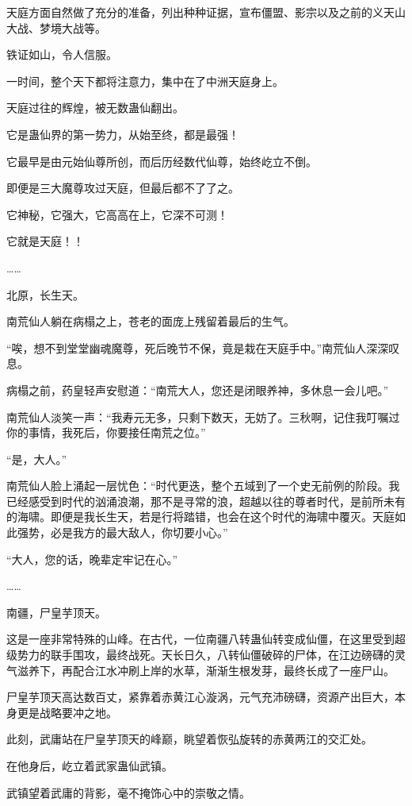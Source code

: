 \begin{this_body}
天庭方面自然做了充分的准备，列出种种证据，宣布僵盟、影宗以及之前的义天山大战、梦境大战等。

铁证如山，令人信服。

一时间，整个天下都将注意力，集中在了中洲天庭身上。

天庭过往的辉煌，被无数蛊仙翻出。

它是蛊仙界的第一势力，从始至终，都是最强！

它最早是由元始仙尊所创，而后历经数代仙尊，始终屹立不倒。

即便是三大魔尊攻过天庭，但最后都不了了之。

它神秘，它强大，它高高在上，它深不可测！

它就是天庭！！

……

北原，长生天。

南荒仙人躺在病榻之上，苍老的面庞上残留着最后的生气。

“唉，想不到堂堂幽魂魔尊，死后晚节不保，竟是栽在天庭手中。”南荒仙人深深叹息。

病榻之前，药皇轻声安慰道：“南荒大人，您还是闭眼养神，多休息一会儿吧。”

南荒仙人淡笑一声：“我寿元无多，只剩下数天，无妨了。三秋啊，记住我叮嘱过你的事情，我死后，你要接任南荒之位。”

“是，大人。”

南荒仙人脸上涌起一层忧色：“时代更迭，整个五域到了一个史无前例的阶段。我已经感受到时代的汹涌浪潮，那不是寻常的浪，超越以往的尊者时代，是前所未有的海啸。即便是我长生天，若是行将踏错，也会在这个时代的海啸中覆灭。天庭如此强势，必是我方的最大敌人，你切要小心。”

“大人，您的话，晚辈定牢记在心。”

……

南疆，尸皇芋顶天。

这是一座非常特殊的山峰。在古代，一位南疆八转蛊仙转变成仙僵，在这里受到超级势力的联手围攻，最终战死。天长日久，八转仙僵破碎的尸体，在江边磅礴的灵气滋养下，再配合江水冲刷上岸的水草，渐渐生根发芽，最终长成了一座尸山。

尸皇芋顶天高达数百丈，紧靠着赤黄江心漩涡，元气充沛磅礴，资源产出巨大，本身更是战略要冲之地。

此刻，武庸站在尸皇芋顶天的峰巅，眺望着恢弘旋转的赤黄两江的交汇处。

在他身后，屹立着武家蛊仙武镇。

武镇望着武庸的背影，毫不掩饰心中的崇敬之情。


\end{this_body}
